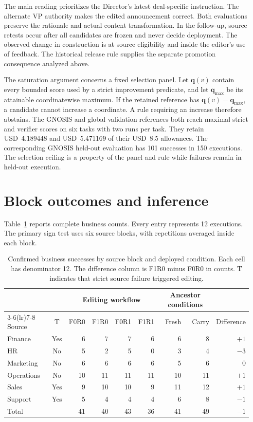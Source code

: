 The main reading prioritizes the Director's latest deal-specific instruction. The alternate VP authority makes the edited announcement correct. Both evaluations preserve the rationale and actual content transformation. In the follow-up, source retests occur after all candidates are frozen and never decide deployment. The observed change in construction is at source eligibility and inside the editor's use of feedback. The historical release rule supplies the separate promotion consequence analyzed above.

The saturation argument concerns a fixed selection panel. Let $\mathbf q(v)$ contain every bounded score used by a strict improvement predicate, and let $\mathbf q_{\max}$ be its attainable coordinatewise maximum. If the retained reference has $\mathbf q(v)=\mathbf q_{\max}$, a candidate cannot increase a coordinate. A rule requiring an increase therefore abstains. The GNOSIS and global validation references both reach maximal strict and verifier scores on six tasks with two runs per task. They retain USD~4.189448 and USD~5.471169 of their USD~8.5 allowances. The corresponding GNOSIS held-out evaluation has 101 successes in 150 executions. The selection ceiling is a property of the panel and rule while failures remain in held-out execution.

\section{Block outcomes and inference}

Table~\ref{tab:blocks} reports complete business counts. Every entry represents 12 executions. The primary sign test uses six source blocks, with repetitions averaged inside each block.

\begin{table}[t]
\centering
\caption{Confirmed business successes by source block and deployed condition. Each cell has denominator 12. The difference column is F1R0 minus F0R0 in counts. T indicates that strict source failure triggered editing.}
\label{tab:blocks}
\small
\renewcommand{\arraystretch}{1.16}
\begin{tabular*}{\textwidth}{@{\extracolsep{\fill}}lcrrrrrrr@{}}
\toprule
& & \multicolumn{4}{c}{Editing workflow} & \multicolumn{2}{c}{Ancestor conditions} & \\
\cmidrule(lr){3-6}\cmidrule(lr){7-8}
Source & T & F0R0 & F1R0 & F0R1 & F1R1 & Fresh & Carry & Difference\\
\midrule
Finance & Yes & 6 & 7 & 7 & 6 & 6 & 8 & $+1$\\
HR & No & 5 & 2 & 5 & 0 & 3 & 4 & $-3$\\
Marketing & No & 6 & 6 & 6 & 6 & 5 & 6 & $0$\\
Operations & No & 10 & 11 & 11 & 11 & 10 & 11 & $+1$\\
Sales & Yes & 9 & 10 & 10 & 9 & 11 & 12 & $+1$\\
Support & Yes & 5 & 4 & 4 & 4 & 6 & 8 & $-1$\\
\midrule
Total & & 41 & 40 & 43 & 36 & 41 & 49 & $-1$\\
\bottomrule
\end{tabular*}
\end{table}

